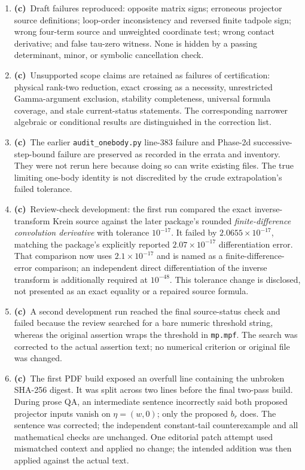 \documentclass[11pt,a4paper]{article}
\newcommand{\C}{\textbf{(c)}\ }
\newcommand{\file}[1]{\nolinkurl{#1}}
\begin{document}
\begin{enumerate}[leftmargin=*]
\item \C Draft failures reproduced: opposite matrix signs; erroneous
projector source definitions; loop-order inconsistency and reversed finite
tadpole sign; wrong four-term source and unweighted coordinate test; wrong
contact derivative; and false tau-zero witness. None is hidden by a passing
determinant, minor, or symbolic cancellation check.
\item \C Unsupported scope claims are retained as failures of certification:
physical rank-two reduction, exact crossing as a necessity, unrestricted
Gamma-argument exclusion, stability completeness, universal formula coverage,
and stale current-status statements. The corresponding narrower algebraic
or conditional results are distinguished in the correction list.
\item \C The earlier \file{audit_onebody.py} line-383 failure and Phase-2d
successive-step-bound failure are preserved as recorded in the errata and
inventory. They were not rerun here because doing so can write existing
files. The true limiting one-body identity is not discredited by the crude
extrapolation's failed tolerance.
\item \C Review-check development: the first run compared the exact
inverse-transform Krein source against the later package's rounded
\emph{finite-difference convolution derivative} with tolerance $10^{-17}$.
It failed by $2.0655\times10^{-17}$, matching the package's explicitly
reported $2.07\times10^{-17}$ differentiation error. That comparison now
uses $2.1\times10^{-17}$ and is named as a finite-difference-error comparison;
an independent direct differentiation of the inverse transform is additionally
required at $10^{-48}$. This tolerance change is disclosed, not presented
as an exact equality or a repaired source formula.
\item \C A second development run reached the final source-status check
and failed because the review searched for a bare numeric threshold string,
whereas the original assertion wraps the threshold in \file{mp.mpf}.
The search was corrected to the actual assertion text; no numerical
criterion or original file was changed.
\item \C The first PDF build exposed an overfull line containing the
unbroken SHA-256 digest. It was split across two lines before the final
two-pass build. During prose QA, an intermediate sentence incorrectly said
both proposed projector inputs vanish on $\eta=(w,0)$; only the proposed
$b_r$ does. The sentence was corrected; the independent constant-tail
counterexample and all mathematical checks are unchanged.
One editorial patch attempt used mismatched context and applied no change;
the intended addition was then applied against the actual text.
\end{enumerate}
\end{document}
